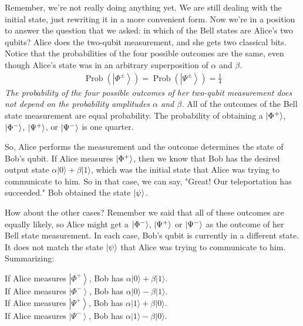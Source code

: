 Remember, we're not really doing anything yet.  We are still dealing with the initial state, just rewriting it in a more convenient form. Now we're in a position to answer the question that we asked: in which of the Bell states are Alice's two qubits? Alice does the two-qubit measurement, and she gets two classical bits. Notice that the probabilities of the four possible outcomes are the same, even though Alice's state was in an arbitrary superposition of $\alpha$ and $\beta$.
\begin{align}
\operatorname{Prob}\left(\left|\Phi^{\pm}\right\rangle\right)=\operatorname{Prob}\left(\left|\Psi^{\pm}\right\rangle\right)=\frac{1}{4}
\end{align}
\emph{The probability of the four possible outcomes of her two-qubit measurement does not depend on the probability amplitudes $\alpha$ and $\beta$.} All of the outcomes of the Bell state measurement are equal probability. The probability of obtaining a $\left| \Phi^+ \right\rangle$, $\left| \Phi^- \right\rangle$, $\left| \Psi^+ \right\rangle$, or $\left| \Psi^- \right\rangle$ is one quarter.

So, Alice performs the measurement and the outcome determines the state of Bob's qubit. If Alice measures $\left| \Phi^+ \right\rangle$, then we know that Bob has the desired output state $\alpha|0\rangle+\beta|1\rangle$, which was the initial state that Alice was trying to communicate to him. So in that case, we can say, "Great! Our teleportation has succeeded." Bob obtained the state $\left| \psi \right\rangle$.

How about the other cases? Remember we said that all of these outcomes are equally likely, so Alice might get a $\left| \Phi^- \right\rangle$, $\left| \Psi^+ \right\rangle$ or $\left| \Psi^- \right\rangle$ as the outcome of her Bell state measurement. In each case, Bob's qubit is currently in a different state. It does not match the state $\left| \psi \right\rangle$ that Alice was trying to communicate to him.  Summarizing:

\noindent
If Alice measures $\left|\Phi^{+}\right\rangle$, Bob has $\alpha|0\rangle+\beta|1\rangle$.\\
If Alice measures $\left|\Phi^{-}\right\rangle$, Bob has $\alpha|0\rangle-\beta|1\rangle$.\\
If Alice measures $\left|\Psi^{+}\right\rangle$, Bob has $\alpha|1\rangle+\beta|0\rangle$.\\
If Alice measures $\left|\Psi^{-}\right\rangle$, Bob has $\alpha|1\rangle-\beta|0\rangle$.

